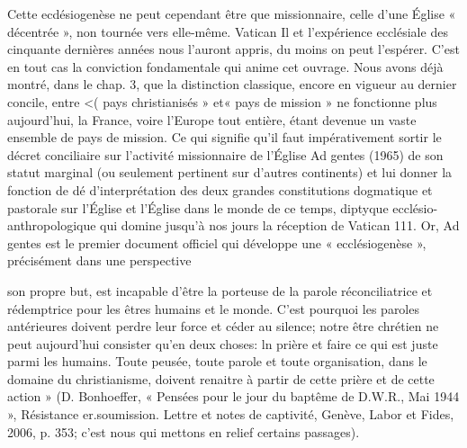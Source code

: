 


Cette ecdésiogenèse ne peut cependant être que missionnaire, celle d'une Église « décentrée », non tournée vers elle-même. Vatican Il et l'expérience ecclésiale des cinquante dernières années nous l'auront appris, du moins on peut l'espérer. C'est en tout cas la conviction fondamentale qui anime cet ouvrage. Nous avons déjà montré, dans le chap. 3, que la distinction classique, encore en vigueur au dernier concile, entre <( pays christianisés » et« pays de mission » ne fonctionne plus aujourd'hui, la France, voire l'Europe tout entière, étant devenue un vaste ensemble de pays de mission. Ce qui signifie qu'il faut impérativement sortir le décret conciliaire sur l'activité missionnaire de l'Église Ad gentes (1965) de son statut marginal (ou seulement pertinent sur d'autres continents) et lui donner la fonction de dé d'interprétation des deux grandes constitutions dogmatique et pastorale sur l'Église et l'Église dans le monde de ce temps, diptyque ecclésio-anthropologique qui domine jusqu'à nos jours la réception de Vatican 111.
Or, Ad gentes est le premier document officiel qui développe une « ecclésiogenèse », précisément dans une perspective

son propre but, est incapable d'être la porteuse de la parole réconciliatrice et rédemptrice pour les êtres humains et le monde. C'est pourquoi les paroles antérieures doivent perdre leur force et céder au silence; notre être chrétien ne peut aujourd'hui consister qu'en deux choses: ln prière et faire ce qui est juste parmi les humains. Toute peusée, toute parole et toute organisation, dans le domaine du christianisme, doivent renaitre à partir de cette prière et de
cette action » (D. Bonhoeffer, « Pensées pour le jour du baptême de D.W.R., Mai 1944 », Résistance er.soumission. Lettre et notes de captivité, Genève, Labor et Fides, 2006, p. 353; c'est nous qui mettons en relief certains passages).

